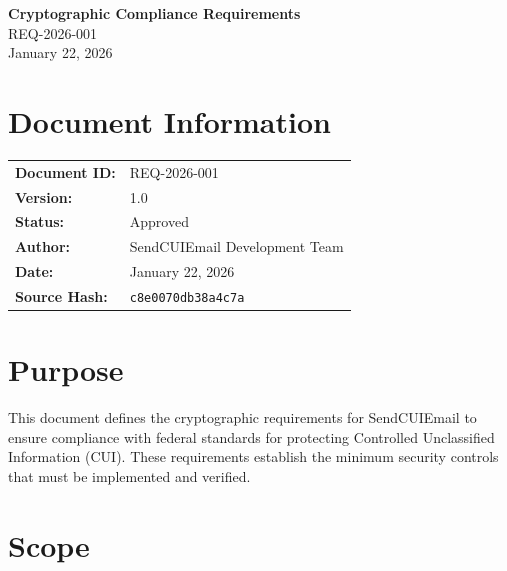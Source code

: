 \documentclass[11pt,letterpaper]{article}
\newcommand{\UniqueID}{REQ-2026-001}
\newcommand{\DocumentDate}{January 22, 2026}
\newcommand{\AuthorName}{SendCUIEmail Development Team}
\newcommand{\DocumentTitle}{Cryptographic Compliance Requirements}
\begin{document}
\begin{center}
\Large\textbf{\DocumentTitle}\\[6pt]
\large\UniqueID\\[12pt]
\normalsize\DocumentDate
\end{center}

\vspace{0.25in}

\section*{Document Information}

\begin{tabular}{@{}ll@{}}
\textbf{Document ID:} & \UniqueID \\
\textbf{Version:} & 1.0 \\
\textbf{Status:} & Approved \\
\textbf{Author:} & \AuthorName \\
\textbf{Date:} & \DocumentDate \\
\textbf{Source Hash:} & \texttt{c8e0070db38a4c7a} \\
\end{tabular}

\vspace{0.25in}

\section{Purpose}

This document defines the cryptographic requirements for SendCUIEmail to ensure compliance with federal standards for protecting Controlled Unclassified Information (CUI). These requirements establish the minimum security controls that must be implemented and verified.

\section{Scope}
\end{document}

